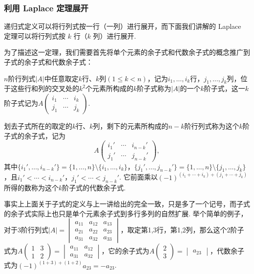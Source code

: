\subsubsection{利用 Laplace 定理展开}

递归式定义可以将行列式按一行（一列）进行展开，而下面我们讲解的 Laplace 定理可以将行列式按 $k$ 行（$k$ 列）进行展开.

为了描述这一定理，我们需要首先将单个元素的余子式和代数余子式的概念推广到子式的余子式和代数余子式：

\begin{definition}{}{}
    $n$阶行列式$|A|$中任意取定$k$行、$k$列$(1\leqslant k<n)$，记为$i_1,\ldots,i_k$行，$j_1,\ldots,j_k$列，位于这些行和列的交叉处的$k^2$个元素所构成的$k$阶子式称为$|A|$的一个$k$阶子式，这一$k$阶子式记为$A\begin{pmatrix}
            i_1 & \cdots & i_k \\
            j_1 & \cdots & j_k
        \end{pmatrix}$.

    划去子式所在的取定的$k$行、$k$列，剩下的元素所构成的$n-k$阶行列式称为这个$k$阶子式的余子式，记为
    \[A\begin{pmatrix}
            i_1' & \cdots & i_{n-k}' \\
            j_1' & \cdots & j_{n-k}'
        \end{pmatrix},\]
    其中$\{i_1',\ldots,i_{n-k}'\}=\{1,\ldots,n\}\setminus\{i_1,\ldots,i_k\}$，$\{j_1',\ldots,j_{n-k}'\}=\{1,\ldots,n\}\setminus\{j_1,\ldots,j_k\}$，且$i_1'<\cdots<i_{n-k}'$，$j_1'<\cdots<j_{n-k}'$. 它前面乘以$(-1)^{(i_1+\cdots+i_k)+(j_1+\cdots+j_k)}$所得的数称为这个$k$阶子式的代数余子式.
\end{definition}

事实上上面关于子式的定义与上一讲给出的完全一致，只是多了一个记号，而子式的余子式实际上也只是单个元素余子式到多行多列的自然扩展. 举个简单的例子，对于3阶行列式$|A|=\begin{vmatrix}
    a_{11} & a_{12} & a_{13} \\
    a_{21} & a_{22} & a_{23} \\
    a_{31} & a_{32} & a_{33}
\end{vmatrix}$，取定第1,3行，第1,2列，那么这个2阶子式为$A\begin{pmatrix}
    1 & 3 \\
    1 & 2
\end{pmatrix}=\begin{vmatrix}
    a_{11} & a_{12} \\
    a_{31} & a_{32}
\end{vmatrix}$，它的余子式为$A\begin{pmatrix}
    2 \\ 3
\end{pmatrix}=\begin{vmatrix}
    a_{23}
\end{vmatrix}$，代数余子式为$(-1)^{(1+3)+(1+2)}a_{23}=-a_{23}$.

